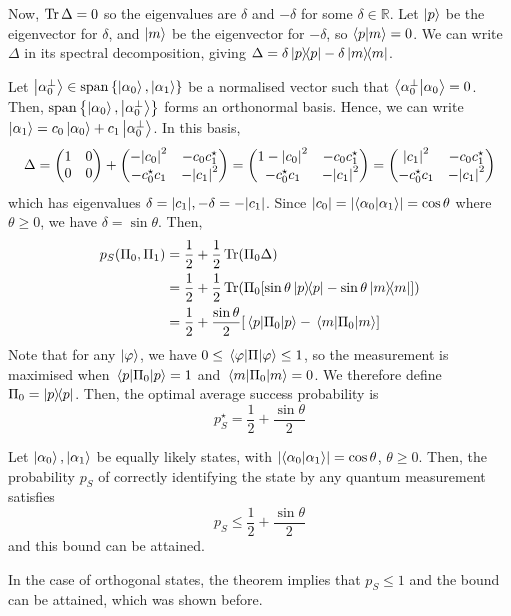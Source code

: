 Now, \( \Tr\Delta = 0 \) so the eigenvalues are \( \delta \) and \( -\delta \) for some \( \delta \in \mathbb R \).
Let \( \ket{p} \) be the eigenvector for \( \delta \), and \( \ket{m} \) be the eigenvector for \( -\delta \), so \( \ip{p}{m} = 0 \).
We can write \( \Delta \) in its spectral decomposition, giving \( \Delta = \delta \op{p}{p} - \delta \op{m}{m} \).

Let \( \ket{\alpha_0^\perp} \in \operatorname{span}\qty{\ket{\alpha_0}, \ket{\alpha_1}} \) be a normalised vector such that \( \ip{\alpha_0^\perp}{\alpha_0} = 0 \).
Then, \( \operatorname{span}\qty{\ket{\alpha_0}, \ket{\alpha_0^\perp}} \) forms an orthonormal basis.
Hence, we can write \( \ket{\alpha_1} = c_0 \ket{\alpha_0} + c_1 \ket{\alpha_0^\perp} \).
In this basis,
\[ \Delta = \begin{pmatrix}
    1 & 0 \\
    0 & 0
\end{pmatrix} + \begin{pmatrix}
    -\abs{c_0}^2 & -c_0 c_1^\star \\
    -c_0^\star c_1 & -\abs{c_1}^2
\end{pmatrix} = \begin{pmatrix}
    1 - \abs{c_0}^2 & -c_0 c_1^\star \\
    -c_0^\star c_1 & -\abs{c_1}^2
\end{pmatrix} = \begin{pmatrix}
    \abs{c_1}^2 & -c_0 c_1^\star \\
    -c_0^\star c_1 & -\abs{c_1}^2
\end{pmatrix} \]
which has eigenvalues \( \delta = \abs{c_1}, -\delta = -\abs{c_1} \).
Since \( \abs{c_0} = \abs{\ip{\alpha_0}{\alpha_1}} = \cos \theta \) where \( \theta \geq 0 \), we have \( \delta = \sin \theta \).
Then,
\begin{align*}
    p_S(\Pi_0, \Pi_1) &= \frac{1}{2} + \frac{1}{2} \Tr(\Pi_0 \Delta) \\
    &= \frac{1}{2} + \frac{1}{2} \Tr(\Pi_0 \qty[\sin\theta \op{p}{p} - \sin\theta \op{m}{m}]) \\
    &= \frac{1}{2} + \frac{\sin\theta}{2} \qty[\ev{\Pi_0}{p} - \ev{\Pi_0}{m}]
\end{align*}
Note that for any \( \ket{\varphi} \), we have \( 0 \leq \ev{\Pi}{\varphi} \leq 1 \), so the measurement is maximised when \( \ev{\Pi_0}{p} = 1 \) and \( \ev{\Pi_0}{m} = 0 \).
We therefore define \( \Pi_0 = \op{p}{p} \).
Then, the optimal average success probability is
\[ p_S^\star = \frac{1}{2} + \frac{\sin\theta}{2} \]
\begin{theorem}
    Let \( \ket{\alpha_0}, \ket{\alpha_1} \) be equally likely states, with \( \abs{\ip{\alpha_0}{\alpha_1}} = \cos\theta \), \( \theta \geq 0 \).
    Then, the probability \( p_S \) of correctly identifying the state by any quantum measurement satisfies
    \[ p_S \leq \frac{1}{2} + \frac{\sin\theta}{2} \]
    and this bound can be attained.
\end{theorem}
In the case of orthogonal states, the theorem implies that \( p_S \leq 1 \) and the bound can be attained, which was shown before.

